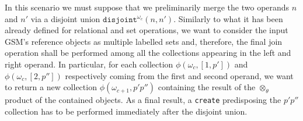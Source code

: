 %
%


\label{def:otimesthetaList} In this scenario we must suppose that we preliminarily merge the two operands $n$ and $n'$ via a disjoint union $\texttt{disjoint}^{\omega_c}(n, n')$. Similarly to what it has been already defined for relational and set operations, we want to consider the input GSM's reference objects as multiple labelled sets and, therefore, the final join operation shall be performed among all the collections appearing in the left and right  operand. In particular, for each collection $\phi(\omega_c,[1,p'])$ and $\phi(\omega_c,[2,p''])$ respectively coming from the first and second operand, we want to return a new collection $\phi(\omega_{c+1},p'p'')$ containing the result of the $\otimes_\theta$ product of the contained objects. As a final result, a \texttt{create} predisposing the $p'p''$ collection has to be performed immediately after the disjoint union.%

